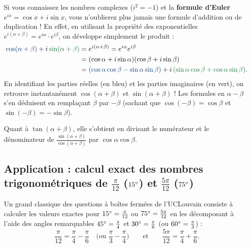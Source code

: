 \begin{astuce}
Si vous connaissez les nombres complexes ($i^2 = -1$) et la \textbf{formule d'Euler} $e^{ix} = \cos x + i\sin x$, vous n'oublierez plus jamais une formule d'addition ou de duplication ! En effet, en utilisant la propriété des exponentielles $e^{i(\alpha+\beta)} = e^{i\alpha} \cdot e^{i\beta}$, on développe simplement le produit :
\begin{align*}
    \textcolor{uclblue}{\cos(\alpha+\beta)} + i\,\textcolor{defgreen}{\sin(\alpha+\beta)} &= e^{i(\alpha+\beta)} = e^{i\alpha} e^{i\beta} \\
    &= (\cos\alpha + i\sin\alpha)(\cos\beta + i\sin\beta) \\
    &= \textcolor{uclblue}{(\cos\alpha\cos\beta - \sin\alpha\sin\beta)} + i\,\textcolor{defgreen}{(\sin\alpha\cos\beta + \cos\alpha\sin\beta)}.
\end{align*}
En identifiant les parties réelles (en bleu) et les parties imaginaires (en vert), on retrouve instantanément $\cos(\alpha+\beta)$ et $\sin(\alpha+\beta)$ ! Les formules en $\alpha-\beta$ s'en déduisent en remplaçant $\beta$ par $-\beta$ (sachant que $\cos(-\beta)=\cos\beta$ et $\sin(-\beta)=-\sin\beta$).

Quant à $\tan(\alpha+\beta)$, elle s'obtient en divisant le numérateur et le dénominateur de $\frac{\sin(\alpha+\beta)}{\cos(\alpha+\beta)}$ par $\cos\alpha\cos\beta$.
\end{astuce}

\subsection{Application : calcul exact des nombres trigonométriques de $\frac{\pi}{12}$ ($15\degree$) et $\frac{5\pi}{12}$ ($75\degree$)}

Un grand classique des questions à boîtes fermées de l'UCLouvain consiste à calculer les valeurs exactes pour $15\degree = \frac{\pi}{12}$ ou $75\degree = \frac{5\pi}{12}$ en les décomposant à l'aide des angles remarquables $45\degree = \frac{\pi}{4}$ et $30\degree = \frac{\pi}{6}$ (ou $60\degree = \frac{\pi}{3}$) :
\[
    \frac{\pi}{12} = \frac{\pi}{4} - \frac{\pi}{6} \quad \text{(ou } \frac{\pi}{3} - \frac{\pi}{4}\text{)} \qquad \text{et} \qquad \frac{5\pi}{12} = \frac{\pi}{4} + \frac{\pi}{6}.
\]

